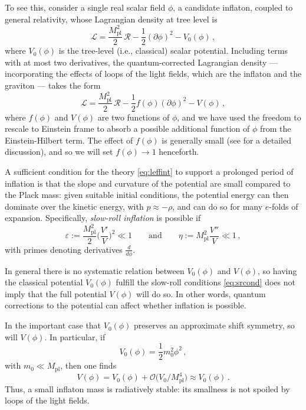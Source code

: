 \documentclass[12pt,a4wide]{article}
\begin{document}
To see this, consider 
a single real scalar
field $\phi$, a candidate inflaton, coupled to general relativity, whose Lagrangian density at tree level is
\begin{equation}\label{eq:ltreeint}
\mathcal{L} = \frac{M_{\text{pl}}^2}{2}\,\mathcal{R} -\frac{1}{2}\left(\partial\phi\right)^2 - V_0(\phi)\,,
\end{equation}
where $V_0(\phi)$ is the tree-level (i.e., classical) scalar potential.  Including terms with at most two derivatives, the quantum-corrected Lagrangian density --- incorporating the effects of loops of the light fields, which are the inflaton and the graviton --- takes the form
\begin{equation}\label{eq:leffint}
\mathcal{L} = \frac{M_{\text{pl}}^2}{2}\,\mathcal{R} -\frac{1}{2} f(\phi) \left(\partial\phi\right)^2 - V(\phi)\,,
\end{equation}
where $f(\phi)$ and $V(\phi)$ are two functions of $\phi$, and we have used the freedom to rescale to Einstein frame to absorb a possible additional function of $\phi$ from the Einstein-Hilbert term.  The effect of $f(\phi)$ is generally small (see \cite{Baumann:2014nda} for a detailed discussion), and so we will set $f(\phi) \to 1$ henceforth.  

A sufficient condition for the theory \eqref{eq:leffint} to support a prolonged period of inflation is that the slope and curvature of the potential are small compared to the Plack mass: given suitable initial conditions, the potential energy can then dominate over the kinetic energy, with $p \approx -\rho$, and can do so for many $e$-folds of expansion.  
Specifically, \emph{slow-roll inflation} is possible if
\begin{equation}\label{eq:srcond}
\varepsilon := \frac{M_{\text{pl}}^2}{2}\biggl(\frac{V'}{V}\biggr)^2 \ll 1 \qquad \text{and} \qquad \eta :=  M_{\text{pl}}^2 \frac{V''}{V} \ll 1\,,
\end{equation} with primes denoting derivatives $\frac{d}{d\phi}$.

In general there is no systematic relation between $V_0(\phi)$ and $V(\phi)$, so having the classical potential $V_0(\phi)$ fulfill the slow-roll conditions \eqref{eq:srcond} does not imply that the full potential $V(\phi)$ will do so.  In other words, quantum corrections to the potential can affect whether inflation is possible.

In the important case that $V_0(\phi)$ preserves an approximate shift symmetry, so will $V(\phi)$.  In particular, if 
\begin{equation}
    V_0(\phi) = \frac{1}{2} m_0^2 \phi^2\,,
\end{equation} with $m_0 \ll M_{\text{pl}}$, then one finds
\begin{equation} \label{eq:vintcorr}
    V(\phi) = V_0(\phi) +\mathcal{O}\bigl(V_0/M_{\text{pl}}^4\bigr) \approx V_0(\phi)\,.
\end{equation}  
Thus, a small inflaton mass is radiatively stable: its smallness is not spoiled by loops of the light fields.  
\end{document}
